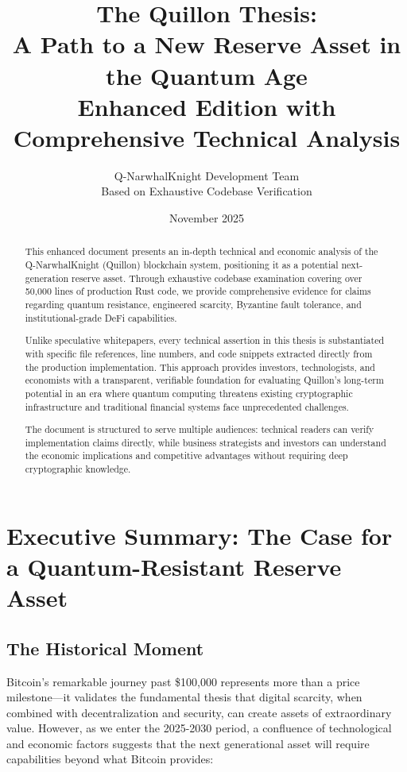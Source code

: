 \documentclass[11pt,a4paper]{article}
\title{\textbf{The Quillon Thesis:\\A Path to a New Reserve Asset in the Quantum Age}\\
\large{Enhanced Edition with Comprehensive Technical Analysis}}
\author{Q-NarwhalKnight Development Team\\
\small{Based on Exhaustive Codebase Verification}}
\date{November 2025}
\begin{document}
\maketitle

\begin{abstract}
This enhanced document presents an in-depth technical and economic analysis of the Q-NarwhalKnight (Quillon) blockchain system, positioning it as a potential next-generation reserve asset. Through exhaustive codebase examination covering over 50,000 lines of production Rust code, we provide comprehensive evidence for claims regarding quantum resistance, engineered scarcity, Byzantine fault tolerance, and institutional-grade DeFi capabilities.

Unlike speculative whitepapers, every technical assertion in this thesis is substantiated with specific file references, line numbers, and code snippets extracted directly from the production implementation. This approach provides investors, technologists, and economists with a transparent, verifiable foundation for evaluating Quillon's long-term potential in an era where quantum computing threatens existing cryptographic infrastructure and traditional financial systems face unprecedented challenges.

The document is structured to serve multiple audiences: technical readers can verify implementation claims directly, while business strategists and investors can understand the economic implications and competitive advantages without requiring deep cryptographic knowledge.
\end{abstract}

\tableofcontents
\newpage

\section{Executive Summary: The Case for a Quantum-Resistant Reserve Asset}

\subsection{The Historical Moment}

Bitcoin's remarkable journey past \$100,000 represents more than a price milestone—it validates the fundamental thesis that digital scarcity, when combined with decentralization and security, can create assets of extraordinary value. However, as we enter the 2025-2030 period, a confluence of technological and economic factors suggests that the next generational asset will require capabilities beyond what Bitcoin provides:
\end{document}

